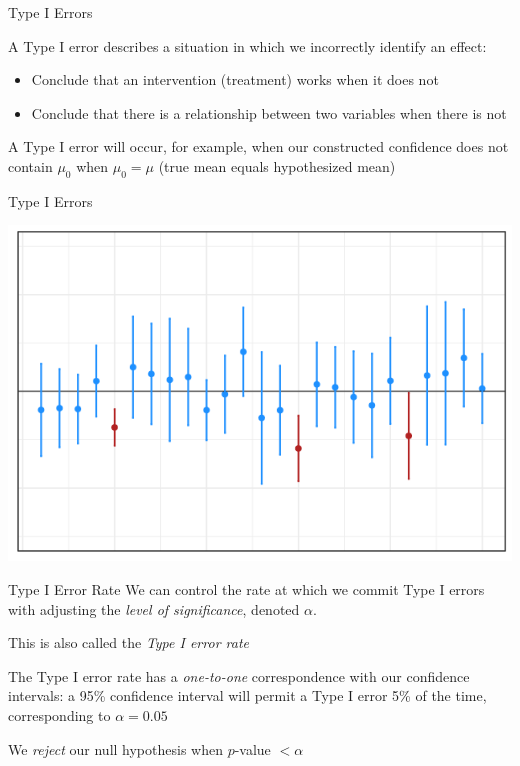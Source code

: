 \documentclass{beamer}
\begin{document}
\begin{frame}{Type I Errors}

A Type I error describes a situation in which we incorrectly identify an effect:
\begin{itemize}
\item Conclude that an intervention (treatment) works when it does not
\item Conclude that there is a relationship between two variables when there is not
\end{itemize}

\vspace{4mm}

A Type I error will occur, for example, when our constructed confidence does not contain $\mu_0$ when $\mu_0 = \mu$ (true mean equals hypothesized mean)

\end{frame}

\begin{frame}{Type I Errors}
\begin{center}
\includegraphics[scale=0.5]{tie.png}
\end{center}
\end{frame}

\begin{frame}{Type I Error Rate}
We can control the rate at which we commit Type I errors with adjusting the \textit{level of significance}, denoted $\alpha$. \vspace{6mm}

This is also called the \textit{Type I error rate} \vspace{6mm}

The Type I error rate has a \textit{one-to-one} correspondence with our confidence intervals: a 95\% confidence interval will permit a Type I error 5\% of the time, corresponding to $\alpha = 0.05$ \vspace{6mm}

We \textit{reject} our null hypothesis when $p$-value $< \alpha$
\end{frame}
\end{document}
